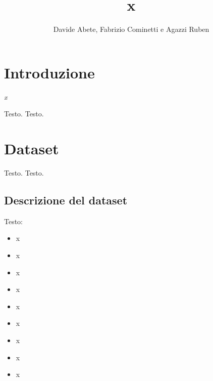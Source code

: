 \documentclass[12pt, a4paper, twocolumn]{article} %
\title{x} %
\author{
	Davide Abete, Fabrizio Cominetti e Agazzi Ruben %
}
\begin{document}

\maketitle %

\thispagestyle{firstpage} %

\tableofcontents
\bigskip
\bigskip
\bigskip
\bigskip
\bigskip
{}


\section{Introduzione}
\textit{x} \cite{x}
\bigskip

Testo. \cite{x} %
Testo.


\section{Dataset}
Testo. \cite{x} %
Testo.

\subsection{Descrizione del dataset}
Testo:
\begin{itemize}
	\item x
	\item x
	\item x
	\item x
	\item x
	\item x
	\item x
	\item x
	\item x
\end{itemize}
\end{document}
